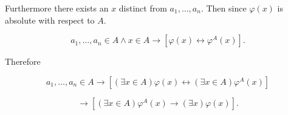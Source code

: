 Furthermore there exists an $x$ distinct from $a_1, \ldots, a_n$. Then since $\varphi(x)$ is absolute with respect to $A$.

$$a_1, \ldots, a_n \in A \wedge x \in A \rightarrow [\varphi(x) \leftrightarrow \varphi^A(x)].$$

Therefore

$$a_1, \ldots, a_n \in A \rightarrow [(\exists x \in A)\varphi(x) \leftrightarrow (\exists x \in A)\varphi^A(x)]$$

$$\rightarrow [(\exists x \in A)\varphi^A(x) \rightarrow (\exists x)\varphi(x)].$$
